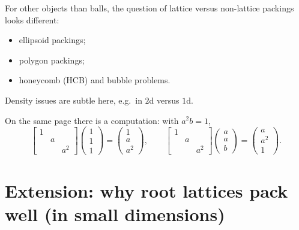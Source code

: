 For other objects than balls, the question of lattice versus non-lattice packings looks different:
\begin{itemize}
  \item ellipsoid packings;
  \item polygon packings;
  \item honeycomb (HCB) and bubble problems. 
\end{itemize}
 Density issues are subtle here, e.g.\ in $2$d versus $1$d.

On the same page there is a computation: with $a^2b=1$,
\[
  \begin{bmatrix} 1&&\\ &a&\\ &&a^2\end{bmatrix}
  \begin{pmatrix}1\\1\\1\end{pmatrix} = \begin{pmatrix}1\\a\\a^2\end{pmatrix},\qquad
  \begin{bmatrix} 1&&\\ &a&\\ &&a^2\end{bmatrix}
  \begin{pmatrix}a\\a\\b\end{pmatrix} = \begin{pmatrix}a\\a^2\\1\end{pmatrix}.
\]

\section{Extension: why root lattices pack well (in small dimensions)}
\label{L04b:sec:rootdense}

